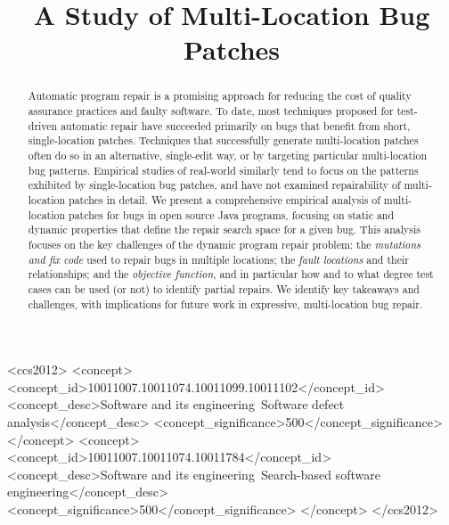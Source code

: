 \documentclass[sigconf, timestamp-false, anonymous=true]{acmart}
\begin{document}
\title{A Study of Multi-Location Bug Patches}


\begin{abstract}
    Automatic program repair is a promising approach for reducing the
    cost of quality assurance practices and faulty software. To date, most
    techniques proposed for test-driven automatic repair have succeeded
    primarily on bugs that benefit from short, single-location patches. Techniques
    that successfully generate multi-location patches often do so in an
    alternative, single-edit way, or by targeting particular multi-location bug
    patterns. Empirical studies of real-world similarly tend to focus on the
    patterns exhibited by single-location bug patches, and have not examined repairability
    of multi-location patches in detail. We present a comprehensive empirical analysis
    of multi-location patches for bugs in open source Java programs, focusing on static and
    dynamic properties that define the repair search space for a given bug.
    This analysis focuses on the key challenges of the dynamic program repair
    problem: the \emph{mutations and fix code} used to repair bugs in multiple locations;
    the \emph{fault locations} and their relationships; and the \emph{objective
      function}, and in particular how and to what degree test cases can be used
    (or not) to identify partial repairs. We identify key takeaways and
    challenges, with implications for future work in expressive, multi-location bug
    repair.
\end{abstract}

\begin{CCSXML}
<ccs2012>
<concept>
<concept_id>10011007.10011074.10011099.10011102</concept_id>
<concept_desc>Software and its engineering~Software defect analysis</concept_desc>
<concept_significance>500</concept_significance>
</concept>
<concept>
<concept_id>10011007.10011074.10011784</concept_id>
<concept_desc>Software and its engineering~Search-based software engineering</concept_desc>
<concept_significance>500</concept_significance>
</concept>
</ccs2012>
\end{CCSXML}

\end{document}
